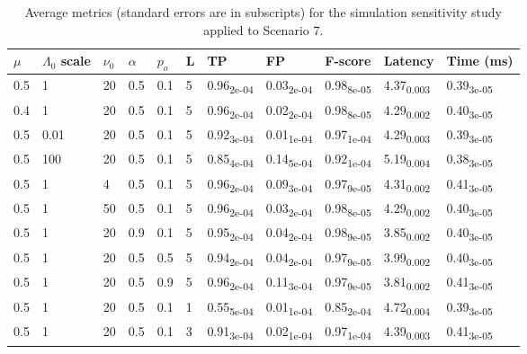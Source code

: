 \begin{table}[H]
\centering
\caption{Average metrics (standard errors are in subscripts) for the simulation sensitivity
study applied to Scenario 7.\\} 
\label{tab:sim_sensitivity_results}
\begin{tabular}{lllllllllll}
  \hline
$\mu$ & $\Lambda_0$ scale & $\nu_0$ & $\alpha$ & $p_o$ & L & TP & FP & F-score & Latency & Time (ms) \\ 
  \hline
0.5 & 1 & 20 & 0.5 & 0.1 & 5 & 0.96\textsubscript{2e-04} & 0.03\textsubscript{2e-04} & 0.98\textsubscript{8e-05} & 4.37\textsubscript{0.003} & 0.39\textsubscript{3e-05} \\ 
  0.4 & 1 & 20 & 0.5 & 0.1 & 5 & 0.96\textsubscript{2e-04} & 0.02\textsubscript{2e-04} & 0.98\textsubscript{8e-05} & 4.29\textsubscript{0.002} & 0.40\textsubscript{3e-05} \\ 
  0.5 & 0.01 & 20 & 0.5 & 0.1 & 5 & 0.92\textsubscript{3e-04} & 0.01\textsubscript{1e-04} & 0.97\textsubscript{1e-04} & 4.29\textsubscript{0.003} & 0.39\textsubscript{3e-05} \\ 
  0.5 & 100 & 20 & 0.5 & 0.1 & 5 & 0.85\textsubscript{4e-04} & 0.14\textsubscript{5e-04} & 0.92\textsubscript{1e-04} & 5.19\textsubscript{0.004} & 0.38\textsubscript{3e-05} \\ 
  0.5 & 1 & 4 & 0.5 & 0.1 & 5 & 0.96\textsubscript{2e-04} & 0.09\textsubscript{3e-04} & 0.97\textsubscript{9e-05} & 4.31\textsubscript{0.002} & 0.41\textsubscript{3e-05} \\ 
  0.5 & 1 & 50 & 0.5 & 0.1 & 5 & 0.96\textsubscript{2e-04} & 0.03\textsubscript{2e-04} & 0.98\textsubscript{8e-05} & 4.29\textsubscript{0.002} & 0.40\textsubscript{3e-05} \\ 
  0.5 & 1 & 20 & 0.9 & 0.1 & 5 & 0.95\textsubscript{2e-04} & 0.04\textsubscript{2e-04} & 0.98\textsubscript{9e-05} & 3.85\textsubscript{0.002} & 0.40\textsubscript{3e-05} \\ 
  0.5 & 1 & 20 & 0.5 & 0.5 & 5 & 0.94\textsubscript{2e-04} & 0.04\textsubscript{2e-04} & 0.97\textsubscript{9e-05} & 3.99\textsubscript{0.002} & 0.40\textsubscript{3e-05} \\ 
  0.5 & 1 & 20 & 0.5 & 0.9 & 5 & 0.96\textsubscript{2e-04} & 0.11\textsubscript{3e-04} & 0.97\textsubscript{9e-05} & 3.81\textsubscript{0.002} & 0.41\textsubscript{3e-05} \\ 
  0.5 & 1 & 20 & 0.5 & 0.1 & 1 & 0.55\textsubscript{5e-04} & 0.01\textsubscript{1e-04} & 0.85\textsubscript{2e-04} & 4.72\textsubscript{0.004} & 0.39\textsubscript{3e-05} \\ 
  0.5 & 1 & 20 & 0.5 & 0.1 & 3 & 0.91\textsubscript{3e-04} & 0.02\textsubscript{1e-04} & 0.97\textsubscript{1e-04} & 4.39\textsubscript{0.003} & 0.41\textsubscript{3e-05} \\ 
  \end{tabular}
\end{table}
